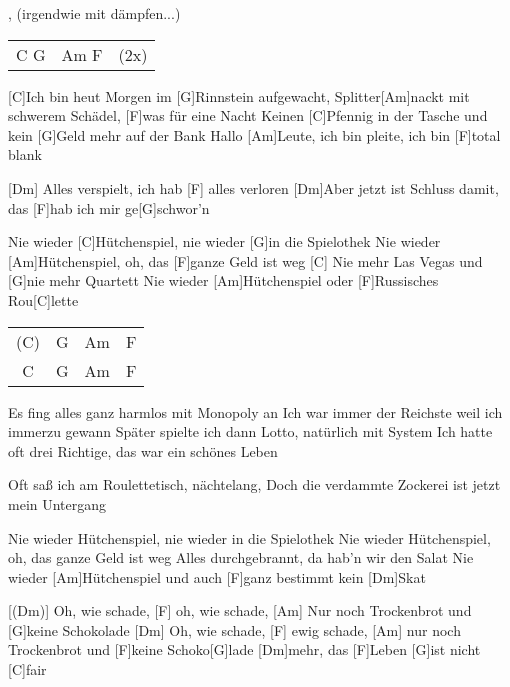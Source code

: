 

, (irgendwie mit dämpfen...) 

\begin{guitar}
	{\footnotesize\begin{tabular}{l|l l}
			C G & Am F & (2x)
	\end{tabular}}
	
	[C]Ich bin heut Morgen im [G]Rinnstein aufgewacht,
	Splitter[Am]nackt mit schwerem Schädel, [F]was für eine Nacht
	Keinen [C]Pfennig in der Tasche und kein [G]Geld mehr auf der Bank
	Hallo [Am]Leute, ich bin pleite, ich bin [F]total blank
	
	[Dm] Alles verspielt, ich hab [F] alles verloren
	[Dm]Aber jetzt ist Schluss damit, das [F]hab ich mir ge[G]schwor'n
	
	
	Nie wieder [C]Hütchenspiel, nie wieder [G]in die Spielothek
	Nie wieder [Am]Hütchenspiel, oh, das [F]ganze Geld ist weg
	[C] Nie mehr Las Vegas und [G]nie mehr Quartett
	Nie wieder [Am]Hütchenspiel oder [F]Russisches Rou[C]lette
	
	{\footnotesize\begin{tabular}{c|c|c|c}
			(C) & G & Am & F\\
			C & G & Am & F
	\end{tabular}}
	
	Es fing alles ganz harmlos mit Monopoly an
	Ich war immer der Reichste weil ich immerzu gewann
	Später spielte ich dann Lotto, natürlich mit System
	Ich hatte oft drei Richtige, das war ein schönes Leben
	
	Oft saß ich am Roulettetisch, nächtelang,
	Doch die verdammte Zockerei ist jetzt mein Untergang
	
	\pagebreak
	Nie wieder Hütchenspiel, nie wieder in die Spielothek
	Nie wieder Hütchenspiel, oh, das ganze Geld ist weg
	Alles durchgebrannt, da hab'n wir den Salat
	Nie wieder [Am]Hütchenspiel und auch [F]ganz bestimmt kein [Dm]Skat
	
	[(Dm)] Oh, wie schade, [F] oh, wie schade,
	[Am] Nur noch Trockenbrot und [G]keine Schokolade
	[Dm] Oh, wie schade, [F] ewig schade,
	[Am] nur noch Trockenbrot und [F]keine Schoko[G]lade [Dm]mehr,
	das [F]Leben [G]ist nicht [C]fair
	

\end{guitar}
